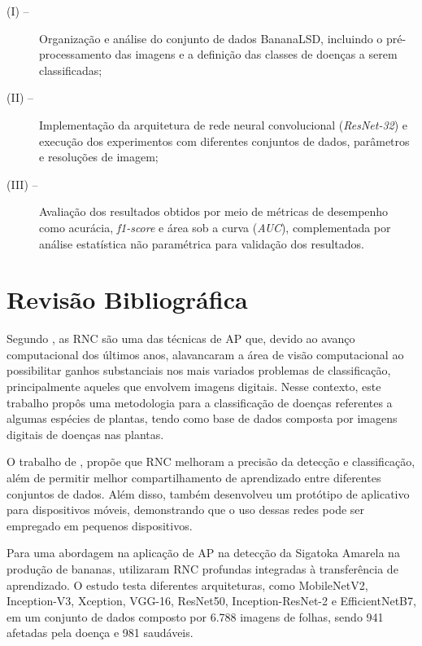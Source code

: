 \begin{description}
    \item[(I) --] Organização e análise do conjunto de dados BananaLSD, incluindo o pré-processamento das imagens e a definição das classes de doenças a serem classificadas;
    
    \item[(II) --] Implementação da arquitetura de rede neural convolucional (\textit{ResNet-32}) e execução dos experimentos com diferentes conjuntos de dados, parâmetros e resoluções de imagem;
    
    \item[(III) --] Avaliação dos resultados obtidos por meio de métricas de desempenho como acurácia, \textit{f1-score} e área sob a curva (\textit{AUC}), complementada por análise estatística não paramétrica para validação dos resultados.
\end{description}


\section{Revisão Bibliográfica} 


Segundo \cite{RezendeArt}, as \ac{RNC} são uma das técnicas de \ac{AP} que, devido ao avanço computacional dos últimos anos, alavancaram a área de visão computacional ao possibilitar ganhos substanciais nos mais variados problemas de classificação, principalmente aqueles que envolvem imagens digitais. Nesse contexto, este trabalho propôs uma metodologia para a classificação de doenças referentes a algumas espécies de plantas, tendo como base de dados composta por imagens digitais de doenças nas plantas.

O trabalho de \cite{leite2022}, propõe que \ac{RNC} melhoram a precisão da detecção e classificação, além de permitir melhor compartilhamento de aprendizado entre diferentes conjuntos de dados. Além disso, também desenvolveu um protótipo de aplicativo para dispositivos móveis, demonstrando que o uso dessas redes pode ser empregado em pequenos dispositivos.

Para uma abordagem na aplicação de \ac{AP} na detecção da Sigatoka Amarela na produção de bananas, \cite{Deteccao_de_sigatoka_am} utilizaram \ac{RNC} profundas integradas à transferência de aprendizado. O estudo testa diferentes arquiteturas, como MobileNetV2, Inception-V3, Xception, VGG-16, ResNet50, Inception-ResNet-2 e EfficientNetB7, em um conjunto de dados composto por 6.788 imagens de folhas, sendo 941 afetadas pela doença e 981 saudáveis. 

